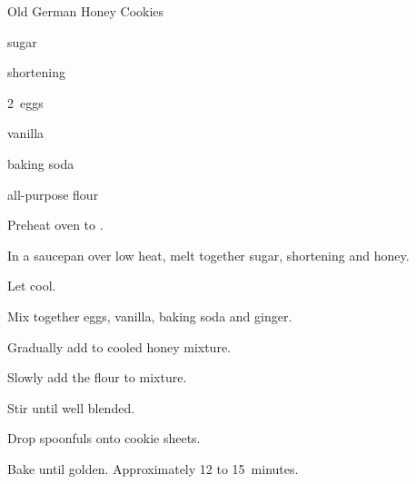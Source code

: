 \begin{recipe}{Old German Honey Cookies}{}{}

\begin{ingredients}
\item {} sugar
\item {} shortening
\item {} 
\item 2~eggs
\item {} vanilla
\item {} baking soda
\item {} all-purpose flour
\item {} 
\end{ingredients}

\begin{directions}
\item Preheat oven to .
\item In a saucepan over low heat, melt together sugar, shortening and honey.
\item Let cool.
\item Mix together eggs, vanilla, baking soda and ginger.
\item Gradually add to cooled honey mixture.
\item Slowly add the flour to mixture.
\item Stir until well blended.
\item Drop spoonfuls onto cookie sheets.
\item Bake until golden. Approximately 12 to 15~minutes.
\end{directions}
\end{recipe}
